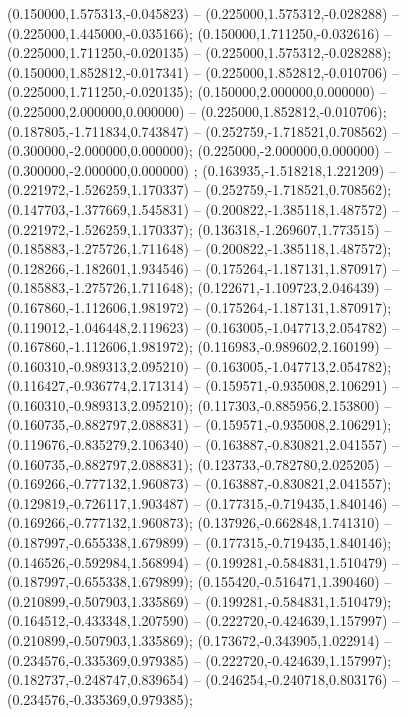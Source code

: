  (0.150000,1.575313,-0.045823) -- (0.225000,1.575312,-0.028288) -- (0.225000,1.445000,-0.035166);
 (0.150000,1.711250,-0.032616) -- (0.225000,1.711250,-0.020135) -- (0.225000,1.575312,-0.028288);
 (0.150000,1.852812,-0.017341) -- (0.225000,1.852812,-0.010706) -- (0.225000,1.711250,-0.020135);
 (0.150000,2.000000,0.000000) -- (0.225000,2.000000,0.000000) -- (0.225000,1.852812,-0.010706);
 (0.187805,-1.711834,0.743847) -- (0.252759,-1.718521,0.708562) -- (0.300000,-2.000000,0.000000);
 (0.225000,-2.000000,0.000000) -- (0.300000,-2.000000,0.000000) ;
 (0.163935,-1.518218,1.221209) -- (0.221972,-1.526259,1.170337) -- (0.252759,-1.718521,0.708562);
 (0.147703,-1.377669,1.545831) -- (0.200822,-1.385118,1.487572) -- (0.221972,-1.526259,1.170337);
 (0.136318,-1.269607,1.773515) -- (0.185883,-1.275726,1.711648) -- (0.200822,-1.385118,1.487572);
 (0.128266,-1.182601,1.934546) -- (0.175264,-1.187131,1.870917) -- (0.185883,-1.275726,1.711648);
 (0.122671,-1.109723,2.046439) -- (0.167860,-1.112606,1.981972) -- (0.175264,-1.187131,1.870917);
 (0.119012,-1.046448,2.119623) -- (0.163005,-1.047713,2.054782) -- (0.167860,-1.112606,1.981972);
 (0.116983,-0.989602,2.160199) -- (0.160310,-0.989313,2.095210) -- (0.163005,-1.047713,2.054782);
 (0.116427,-0.936774,2.171314) -- (0.159571,-0.935008,2.106291) -- (0.160310,-0.989313,2.095210);
 (0.117303,-0.885956,2.153800) -- (0.160735,-0.882797,2.088831) -- (0.159571,-0.935008,2.106291);
 (0.119676,-0.835279,2.106340) -- (0.163887,-0.830821,2.041557) -- (0.160735,-0.882797,2.088831);
 (0.123733,-0.782780,2.025205) -- (0.169266,-0.777132,1.960873) -- (0.163887,-0.830821,2.041557);
 (0.129819,-0.726117,1.903487) -- (0.177315,-0.719435,1.840146) -- (0.169266,-0.777132,1.960873);
 (0.137926,-0.662848,1.741310) -- (0.187997,-0.655338,1.679899) -- (0.177315,-0.719435,1.840146);
 (0.146526,-0.592984,1.568994) -- (0.199281,-0.584831,1.510479) -- (0.187997,-0.655338,1.679899);
 (0.155420,-0.516471,1.390460) -- (0.210899,-0.507903,1.335869) -- (0.199281,-0.584831,1.510479);
 (0.164512,-0.433348,1.207590) -- (0.222720,-0.424639,1.157997) -- (0.210899,-0.507903,1.335869);
 (0.173672,-0.343905,1.022914) -- (0.234576,-0.335369,0.979385) -- (0.222720,-0.424639,1.157997);
 (0.182737,-0.248747,0.839654) -- (0.246254,-0.240718,0.803176) -- (0.234576,-0.335369,0.979385);
